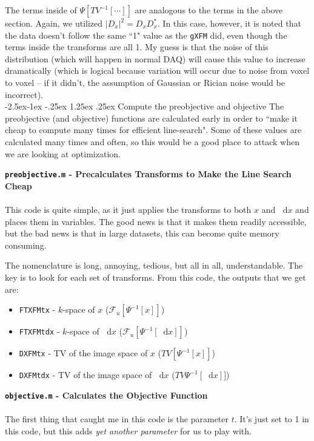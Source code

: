 \documentclass[11 pt]{article}
\makeatletter
\renewcommand\subparagraph{\@startsection{subparagraph}{5}{\z@}%
            {-2.5ex\@plus -1ex \@minus -.25ex}%
            {1.25ex \@plus .25ex}%
            {\normalfont\normalsize\bfseries}}
\newcommand*\diff{\mathop{}\!\mathrm{d}}
\newcommand{\bo}{\noindent\textbf}
\makeatother
\begin{document}
            The terms inside of $\Psi[TV^{-1}[\dotsm]]$ are analogous to the terms in the above section. Again, we utilized $|D_x|^2 = D_x D_x^*$. In this case, however, it is noted that the data doesn't follow the same ``1" value as the \texttt{gXFM} did, even though the terms inside the transforms are all 1. My guess is that the noise of this distribution (which will happen in normal DAQ) will cause this value to increase dramatically (which is logical because variation will occur due to noise from voxel to voxel -- if it didn't, the assumption of Gaussian or Rician noise would be incorrect).\\

        \subparagraph{Compute the preobjective and objective}
          The preobjective (and objective) functions are calculated early in order to ``make it cheap to compute many times for efficient line-search". Some of these values are calculated many times and often, so this would be a good place to attack when we are looking at optimization.
          
          
          \bo{\texttt{preobjective.m} - Precalculates Transforms to Make the Line Search Cheap}
            \hfill\\\\
            This code is quite simple, as it just applies the transforms to both $x$ and $\diff x$ and places them in variables. The good news is that it makes them readily accessible, but the bad news is that in large datasets, this can become quite memory consuming. 

            The nomenclature is long, annoying, tedious, but all in all, understandable. The key is to look for each set of transforms. From this code, the outputs that we get are:
            \begin{itemize}
              \item \texttt{FTXFMtx} - $k$-space of $x$ ($\mathcal{F}_u[\Psi^{-1}[x]]$) 
              \item \texttt{FTXFMtdx} - $k$-space of $\diff x$ ($\mathcal{F}_u[\Psi^{-1}[\diff x]]$)
              \item \texttt{DXFMtx} - TV of the image space of $x$ ($TV[\Psi^{-1}[x]]$) 
              \item \texttt{DXFMtdx} - TV of the image space of $\diff x$  ($TV\Psi^{-1}[\diff x]]$)
              \end{itemize}

          \bo{\texttt{objective.m} - Calculates the Objective Function}
            \hfill\\\\
            The first thing that caught me in this code is the parameter $t$. It's just set to 1 in this code, but this adds \emph{yet another parameter} for us to play with. 
\end{document}
